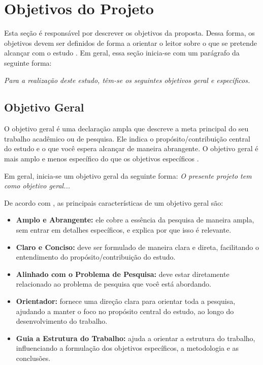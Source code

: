 \section{Objetivos do Projeto}\label{sec:obj_proj}

Esta seção é responsável por descrever os objetivos da proposta. Dessa forma, os objetivos devem ser definidos de forma a orientar o leitor sobre o que se pretende alcançar com o estudo \cite{Marconi2021}. Em geral, essa seção inicia-se com um parágrafo da seguinte forma:

\textit{Para a realização deste estudo, têm-se os seguintes objetivos geral e específicos.}

\subsection{Objetivo Geral}

O objetivo geral é uma declaração ampla que descreve a meta principal do seu trabalho acadêmico ou de pesquisa. Ele indica o propósito/contribuição central do estudo e o que você espera alcançar de maneira abrangente. O objetivo geral é mais amplo e menos específico do que os objetivos específicos \cite{Marconi2021,Wazlawick2021}.

Em geral, inicia-se um objetivo geral da seguinte forma: \textit{O presente projeto tem como objetivo geral...}

De acordo com , as principais características de um objetivo geral são:
\begin{itemize}[itemsep=0pt, leftmargin=2.5cm]
    \item \textbf{Amplo e Abrangente:} ele cobre a essência da pesquisa de maneira ampla, sem entrar em detalhes específicos, e explica por que isso é relevante.
    \item \textbf{Claro e Conciso:} deve ser formulado de maneira clara e direta, facilitando o entendimento do propósito/contribuição do estudo.
    \item \textbf{Alinhado com o Problema de Pesquisa:} deve estar diretamente relacionado ao problema de pesquisa que você está abordando.
    \item \textbf{Orientador:} fornece uma direção clara para orientar toda a pesquisa, ajudando a manter o foco no propósito central do estudo, ao longo do desenvolvimento do trabalho.
    \item \textbf{Guia a Estrutura do Trabalho:} ajuda a orientar a estrutura do trabalho, influenciando a formulação dos objetivos específicos, a metodologia e as conclusões.
\end{itemize}

